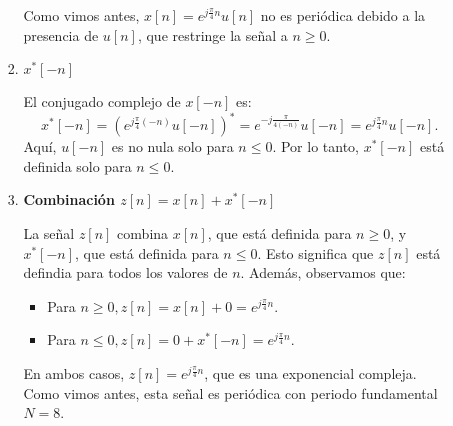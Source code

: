 \begin{enumerate}[label=\color{red}\textbf{\arabic*)}]
\begin{enumerate}[label=\textbf{\arabic*)}]
\begin{enumerate}[label=\textbf{\alph*)}]
                     Como vimos antes,  $x[n]=e^{j\frac{\pi}{4} n} u[n]$ no es periódica debido a la presencia de $u[n]$, que restringe la señal a  $n\ge 0$.
                 \item $x^*[-n]$

                     El conjugado complejo de  $x[-n]$ es:  \[
                         x^*[-n]=\left( e^{j\frac{\pi}{4} (-n)} u[-n] \right) ^*=e^{-j\frac{\pi}{4(-n)} } u[-n]=e^{j\frac{\pi}{4} n} u[-n].
                     \] 
                     Aquí, $u[-n]$ es no nula solo para  $n\le 0$. Por lo tanto, $x^*[-n]$ está definida solo para  $n\le 0$.
                 \item \textbf{Combinación $z[n]=x[n]+x^*[-n]$} 

                     La señal $z[n]$ combina  $x[n]$, que está definida para  $n\ge 0$, y $x^*[-n]$, que está definida para  $n\le 0$. Esto significa que $z[n]$ está defindia para todos los valores de  $n$. Además, observamos que:
                      \begin{itemize}[label=\textbullet]
                          \item Para $n\ge 0,z[n]=x[n]+0=e^{j\frac{\pi}{4} n}. $ 
                          \item Para $n\le 0,z[n]=0+x^*[-n]=e^{j\frac{\pi}{4} n} $.
                     \end{itemize}
                     En ambos casos, $z[n]=e^{j\frac{\pi}{4} n} $, que es una exponencial compleja. Como vimos antes, esta señal es periódica con periodo fundamental $N=8$.
            \end{enumerate}
    \end{enumerate}
    \begin{center}
\end{center}
\end{enumerate}
